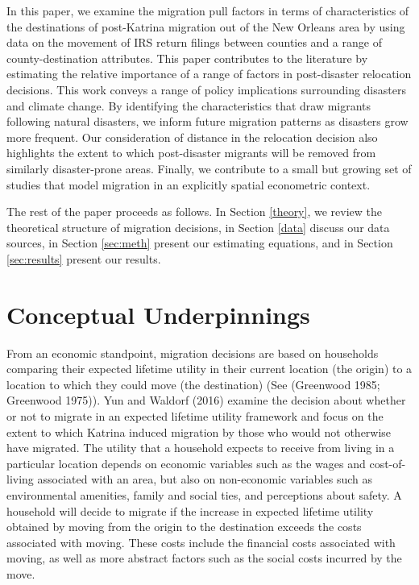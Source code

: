 \documentclass[]{article}
\begin{document}
In this paper, we examine the migration pull factors in terms of
characteristics of the destinations of post-Katrina migration out of the
New Orleans area by using data on the movement of IRS return filings
between counties and a range of county-destination attributes. This
paper contributes to the literature by estimating the relative
importance of a range of factors in post-disaster relocation decisions.
This work conveys a range of policy implications surrounding disasters
and climate change. By identifying the characteristics that draw
migrants following natural disasters, we inform future migration
patterns as disasters grow more frequent. Our consideration of distance
in the relocation decision also highlights the extent to which
post-disaster migrants will be removed from similarly disaster-prone
areas. Finally, we contribute to a small but growing set of studies that
model migration in an explicitly spatial econometric context.

The rest of the paper proceeds as follows. In Section \ref{theory}, we
review the theoretical structure of migration decisions, in Section
\ref{data} discuss our data sources, in Section \ref{sec:meth} present
our estimating equations, and in Section \ref{sec:results} present our
results.

\section{\texorpdfstring{Conceptual Underpinnings
\label{theory}}{Conceptual Underpinnings }}\label{conceptual-underpinnings}

From an economic standpoint, migration decisions are based on households
comparing their expected lifetime utility in their current location (the
origin) to a location to which they could move (the destination) (See
(Greenwood 1985; Greenwood 1975)). Yun and Waldorf (2016) examine the
decision about whether or not to migrate in an expected lifetime utility
framework and focus on the extent to which Katrina induced migration by
those who would not otherwise have migrated. The utility that a
household expects to receive from living in a particular location
depends on economic variables such as the wages and cost-of-living
associated with an area, but also on non-economic variables such as
environmental amenities, family and social ties, and perceptions about
safety. A household will decide to migrate if the increase in expected
lifetime utility obtained by moving from the origin to the destination
exceeds the costs associated with moving. These costs include the
financial costs associated with moving, as well as more abstract factors
such as the social costs incurred by the move.
\end{document}
